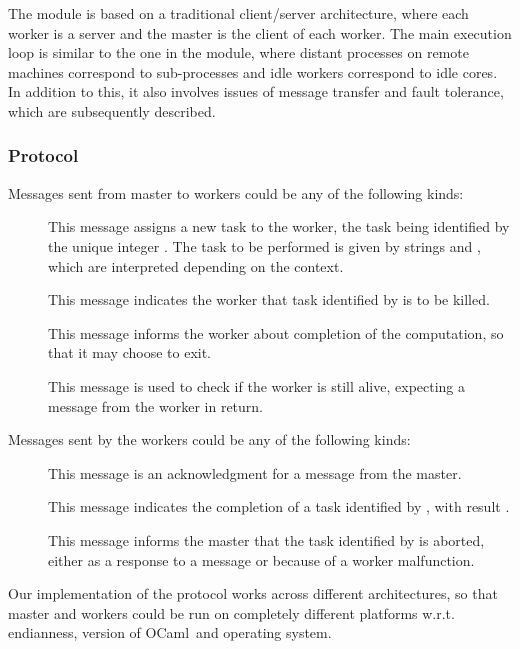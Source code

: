 \documentclass[preprint]{sigplanconf}
\newcommand{\Ocaml}{OCaml}
\begin{document}
The  module is based on a traditional client/server
architecture, where each worker is a server and the master is the
client of each worker. The main execution loop is similar to the one
in the  module, where distant processes on remote machines
correspond to sub-processes and idle workers correspond to idle
cores. In addition to this, it also involves issues of message
transfer and fault tolerance, which are subsequently described.

\subsubsection{Protocol}\label{sec:protocol}

Messages sent from master to workers could be any of the following kinds:
\begin{description}
\item[] This message assigns a
  new task to the worker, the task being identified by the unique
  integer . The task to be performed is given by strings 
  and , which are interpreted depending on the context.

\item[] This message indicates the worker that task
  identified by  is to be killed.

\item[] This message informs the worker about completion of
  the computation, so that it may choose to exit.

\item[] This message is used to check if the worker is still
  alive, expecting a  message from the worker in return.
\end{description}
Messages sent by the workers could be any of the following kinds:
\begin{description}
\item[] This message is an acknowledgment for a 
  message from the master.

\item[] This message indicates the
  completion of a task identified by , with result .

\item[] This message informs the master that the
  task identified by  is aborted, either as a response to a
   message or because of a worker malfunction.
\end{description}
Our implementation of the protocol works across different
architectures, so that master and workers could be run on completely
different platforms w.r.t. endianness, version of \Ocaml\ and
operating system.
\end{document}

